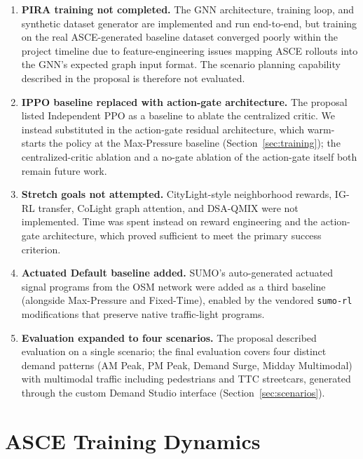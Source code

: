 \documentclass{article}
\begin{document}
\begin{enumerate}[nosep]
  \item \textbf{PIRA training not completed.} The GNN architecture, training loop, and synthetic dataset generator are implemented and run end-to-end, but training on the real ASCE-generated baseline dataset converged poorly within the project timeline due to feature-engineering issues mapping ASCE rollouts into the GNN's expected graph input format. The scenario planning capability described in the proposal is therefore not evaluated.
  \item \textbf{IPPO baseline replaced with action-gate architecture.} The proposal listed Independent PPO as a baseline to ablate the centralized critic. We instead substituted in the action-gate residual architecture, which warm-starts the policy at the Max-Pressure baseline (Section~\ref{sec:training}); the centralized-critic ablation and a no-gate ablation of the action-gate itself both remain future work.
  \item \textbf{Stretch goals not attempted.} CityLight-style neighborhood rewards, IG-RL transfer, CoLight graph attention, and DSA-QMIX were not implemented. Time was spent instead on reward engineering and the action-gate architecture, which proved sufficient to meet the primary success criterion.
  \item \textbf{Actuated Default baseline added.} SUMO's auto-generated actuated signal programs from the OSM network were added as a third baseline (alongside Max-Pressure and Fixed-Time), enabled by the vendored \texttt{sumo-rl} modifications that preserve native traffic-light programs.
  \item \textbf{Evaluation expanded to four scenarios.} The proposal described evaluation on a single scenario; the final evaluation covers four distinct demand patterns (AM Peak, PM Peak, Demand Surge, Midday Multimodal) with multimodal traffic including pedestrians and TTC streetcars, generated through the custom Demand Studio interface (Section~\ref{sec:scenarios}).
\end{enumerate}


\appendix

\section{ASCE Training Dynamics}
\label{app:training_dynamics}
\end{document}
